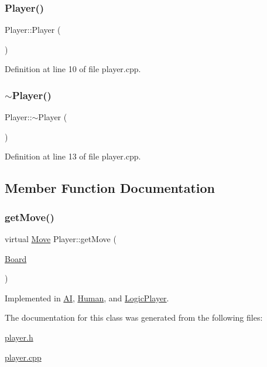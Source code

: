 \subsubsection{\texorpdfstring{Player()}{Player()}}
{\footnotesize\ttfamily Player\+::\+Player (\begin{DoxyParamCaption}{ }\end{DoxyParamCaption})}



Definition at line 10 of file player.\+cpp.

\mbox{\label{class_player_a749d2c00e1fe0f5c2746f7505a58c062}} 
\subsubsection{\texorpdfstring{$\sim$\+Player()}{~Player()}}
{\footnotesize\ttfamily Player\+::$\sim$\+Player (\begin{DoxyParamCaption}{ }\end{DoxyParamCaption})\hspace{0.3cm}{\ttfamily [virtual]}}



Definition at line 13 of file player.\+cpp.



\subsection{Member Function Documentation}
\mbox{\label{class_player_a97a516ce71ccef14123884b562c90e4c}} 
\subsubsection{\texorpdfstring{get\+Move()}{getMove()}}
{\footnotesize\ttfamily virtual \hyperlink{struct_move}{Move} Player\+::get\+Move (\begin{DoxyParamCaption}\item[{\hyperlink{constants_8h_af901d0acc1572fb0c779f84ddd2c6ce8}{Board}}]{ }\end{DoxyParamCaption})\hspace{0.3cm}{\ttfamily [pure virtual]}}



Implemented in \hyperlink{class_a_i_a2d1a6ed520e3b3ada7133bd03d405d6d}{AI}, \hyperlink{class_human_a61228d0fbea51c587ea5383d84b152d8}{Human}, and \hyperlink{class_logic_player_a43a34db899e75294d73c18477c139e6a}{Logic\+Player}.



The documentation for this class was generated from the following files\+:\begin{DoxyCompactItemize}
\item 
\hyperlink{player_8h}{player.\+h}\item 
\hyperlink{player_8cpp}{player.\+cpp}\end{DoxyCompactItemize}
